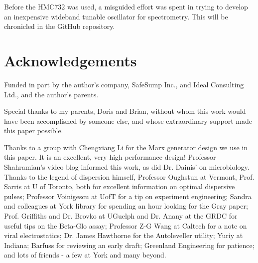 \documentclass[paper.tex]{subfiles}
\begin{document}
\begin{multicols}{1}

%	

Before the HMC732 was used, a misguided effort was spent in trying to develop an inexpensive wideband tunable oscillator for spectrometry. This will be chronicled in the GitHub repository.

\end{multicols}

\section{Acknowledgements}

Funded in part by the author's company, SafeSump Inc., and Ideal Consulting Ltd., and the author's parents.

Special thanks to my parents, Doris and Brian, without whom this work would have been accomplished by someone else, and whose extraordinary support made this paper possible.

Thanks to a group with Chengxiang Li for the Marx generator design we use in this paper. It is an excellent, very high performance design! Professor Shahramian's video blog informed this work, as did Dr. Dainis' on microbiology. Thanks to the legend of dispersion himself, Professor Oughstun at Vermont, Prof. Sarris at U of Toronto, both for excellent information on optimal dispersive pulses; Professor Voinigescu at UofT for a tip on experiment engineering; Sandra and colleagues at York library for spending an hour looking for the Gray paper; Prof. Griffiths and Dr. Brovko at UGuelph and Dr. Anany at the GRDC for useful tips on the Beta-Glo assay; Professor Z-G Wang at Caltech for a note on viral electrostatics; Dr. James Hawthorne for the Autoleveller utility; Yuriy at Indiana; Barfuss for reviewing an early draft; Greenland Engineering for patience; and lots of friends - a few at York and many beyond. 
\end{document}
